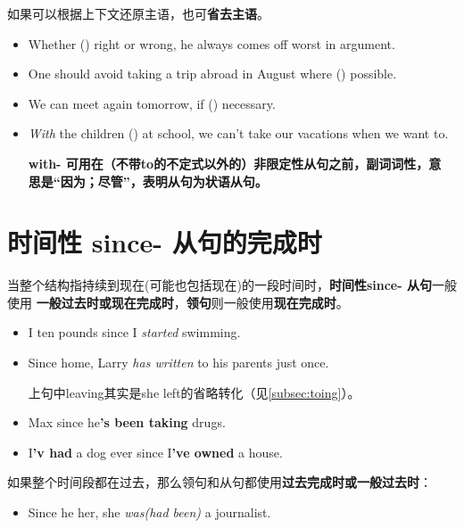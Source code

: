 如果可以根据上下文还原主语，也可\textbf{省去主语}。
\begin{itemize}
\item Whether () right or wrong, he always comes off worst in
  argument.

\item One should avoid taking a trip abroad in August where () possible.

\item We can meet again tomorrow, if () necessary.

\item \emph{With} the children () at school, we can't take our
  vacations when we want to.

  \textbf{with- 可用在（不带to的不定式以外的）非限定性从句之前，副词词性，意
    思是“因为；尽管”，表明从句为状语从句。}
\end{itemize}

\section{时间性 since- 从句的完成时}

当整个结构指持续到现在(可能也包括现在)的一段时间时，\textbf{时间性since- 从句}一般使用
\textbf{一般过去时或现在完成时}，\textbf{领句}则一般使用\textbf{现在完成时}。

\begin{itemize}
\item I  ten pounds since I \emph{started} swimming.
\item Since  home, Larry \emph{has written} to his parents just once.

  上句中leaving其实是she left的省略转化（见\cref{subsec:toing}）。

\item Max  since he\textbf{'s been taking} drugs.
\item I\textbf{'v had} a dog ever since I\textbf{'ve owned} a house.
\end{itemize}

如果整个时间段都在过去，那么领句和从句都使用\textbf{过去完成时或一般过去时}：
\begin{itemize}
\item Since he  her, she \emph{was(had been)} a journalist.
\end{itemize}

